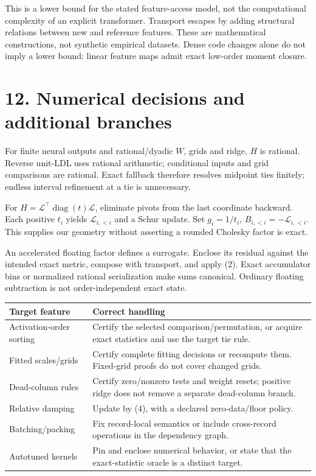 \documentclass[11pt]{article}
\begin{document}
This is a lower bound for the stated feature-access model, not the computational complexity of an explicit transformer. Transport escapes by adding structural relations between new and reference features. These are mathematical constructions, not synthetic empirical datasets. Dense code changes alone do not imply a lower bound: linear feature maps admit exact low-order moment closure.

\newpage
\section*{12. Numerical decisions and additional branches}
For finite neural outputs and rational/dyadic $W$, grids and ridge, $H$ is rational. Reverse unit-LDL uses rational arithmetic; conditional inputs and grid comparisons are rational. Exact fallback therefore resolves midpoint ties finitely; endless interval refinement at a tie is unnecessary.

For $H=\mathcal L^{\top}\operatorname{diag}(t)\mathcal L$, eliminate pivots from the last coordinate backward. Each positive $t_i$ yields $\mathcal L_{i,<i}$ and a Schur update. Set $g_i=1/t_i$, $B_{i,<i}=-\mathcal L_{i,<i}$. This supplies our geometry without asserting a rounded Cholesky factor is exact.

An accelerated floating factor defines a surrogate. Enclose its residual against the intended exact metric, compose with transport, and apply (2). Exact accumulator bins or normalized rational serialization make sums canonical. Ordinary floating subtraction is not order-independent exact state.

\begin{tabularx}{\linewidth}{@{}p{.27\linewidth}X@{}}\toprule
Target feature & Correct handling\\\midrule
Activation-order sorting & Certify the selected comparison/permutation, or acquire exact statistics and use the target tie rule.\\
Fitted scales/grids & Certify complete fitting decisions or recompute them. Fixed-grid proofs do not cover changed grids.\\
Dead-column rules & Certify zero/nonzero tests and weight resets; positive ridge does not remove a separate dead-column branch.\\
Relative damping & Update by (4), with a declared zero-data/floor policy.\\
Batching/packing & Fix record-local semantics or include cross-record operations in the dependency graph.\\
Autotuned kernels & Pin and enclose numerical behavior, or state that the exact-statistic oracle is a distinct target.\\\bottomrule
\end{tabularx}
\end{document}
